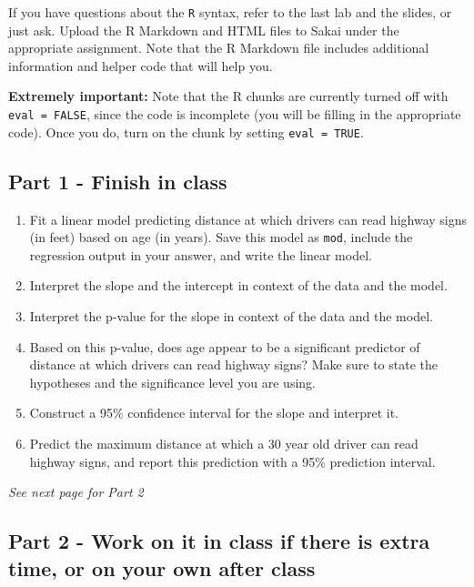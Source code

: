 \documentclass[11pt]{article}
\begin{document}
If you have questions about the \texttt{R} syntax, refer to the last lab and the slides, or just ask. Upload the R Markdown and HTML 
files to Sakai under the appropriate assignment. Note that the R Markdown file includes additional information and helper code that 
will help you.

\textbf{Extremely important:} Note that the R chunks are currently turned off with 
\texttt{eval = FALSE}, since the code is incomplete (you will be filling in the 
appropriate code). Once you do, turn on the chunk by setting \texttt{eval = TRUE}.


\subsection*{Part 1 - Finish in class}

\begin{enumerate}
\item Fit a linear model predicting distance at which drivers can read highway signs (in feet) based on age (in years). Save this model 
as \texttt{mod}, include the regression output in your answer, and write the linear model.

\item Interpret the slope and the intercept in context of the data and the model.

\item Interpret the p-value for the slope in context of the data  and the model.

\item Based on this p-value, does age appear to be a significant predictor of distance at which drivers can read highway signs? Make sure 
to state the hypotheses and the significance level you are using.

\item Construct a 95\% confidence interval for the slope and interpret it.

\item Predict the maximum distance at which a 30 year old driver can read highway signs, and report this prediction with a 95\%
prediction interval.

\end{enumerate}

\vfill

\begin{center}
\textit{See next page for Part 2}
\end{center}

%

\subsection*{Part 2 - Work on it in class if there is extra time, or on your own after class}
\end{document}
